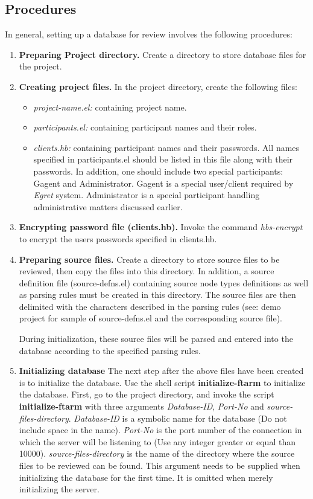 \subsection {Procedures}
In general, setting up a database for review involves the following
procedures: 
\begin{enumerate}
\item {\bf Preparing Project directory.}  Create a directory to store
  database files for the  project.
\item {\bf Creating project files.}  In the project directory, create
  the following files:
\begin {itemize}
\item {\it project-name.el:} containing project name.
\item {\it participants.el:} containing participant names and their
  roles.
\item {\it clients.hb:} containing participant names and their
  passwords. All names specified in participants.el should be listed
  in this file along with their passwords. In addition, one should
  include two special participants: Gagent and  Administrator. Gagent 
  is a special user/client required by {\it Egret} system. Administrator
  is a special participant handling administrative matters discussed
  earlier. 
\end{itemize}

\item {\bf Encrypting password file (clients.hb).}  Invoke the command
  {\it hbs-encrypt} to encrypt the users passwords specified in clients.hb.

\item {\bf Preparing source files.}  Create a directory to store
  source files to be reviewed, then copy the files into this directory.
  In addition, a source definition file (source-defns.el) containing
  source node types definitions as well as parsing rules must be
  created in this directory.  The source files are then delimited with
  the characters described in the parsing rules (see: demo project for
  sample of source-defns.el and the corresponding source file).

  During initialization, these source files will be parsed and entered
  into the database according to the specified parsing rules.

\item {\bf Initializing database}
The next step after the above files have been created is to initialize
the database. Use the shell script {\bf initialize-ftarm} to
initialize the database.
First, go to the project directory, and invoke the script {\bf
initialize-ftarm} 
with three arguments {\it Database-ID}, {\it Port-No} and {\it
source-files-directory}. 
{\it Database-ID} is a symbolic
name for the database (Do not include space in the
name). {\it Port-No} is the port number of the connection in which the
server will be listening to (Use any integer greater or equal
than 10000). 
{\it source-files-directory} is the name of the directory where the
source files to be reviewed can be found. This argument needs to
be supplied when initializing the database for the first time. It
is omitted when merely initializing the server.


\end{enumerate}
